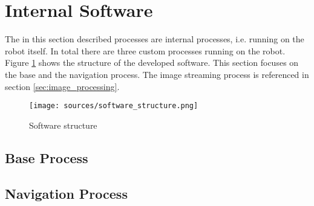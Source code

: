 \newpage

\section{Internal Software}

The in this section described processes are internal processes, i.e. running on the robot itself. In total there are three custom processes running on the robot. Figure \ref{fig:software} shows the structure of the developed software. This section focuses on the base and the navigation process. The image streaming process is referenced in section \ref{sec:image_processing}. 

\begin{figure}[H]
\centering
\texttt{[image: sources/software\_structure.png]}
\caption[Software structure]{Software structure}
\label{fig:software}
\end{figure}

\subsection{Base Process}

\subsection{Navigation Process}



